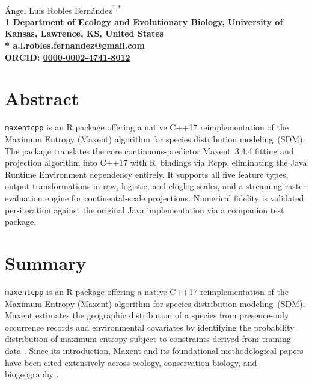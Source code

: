 \documentclass[10pt,letterpaper]{article}
\begin{document}
\vspace*{0.35in}

\begin{flushleft}
{\Large
\textbf{}
}
\newline
\\
\'Angel Luis Robles Fern\'andez\textsuperscript{1,*}
\\
\bigskip
\bf{1} Department of Ecology and Evolutionary Biology, University of Kansas, Lawrence, KS, United States
\\
\bigskip
* a.l.robles.fernandez@gmail.com
\\
ORCID: \href{https://orcid.org/0000-0002-4741-8012}{0000-0002-4741-8012}

\end{flushleft}

\section*{Abstract}

\texttt{maxentcpp} is an R package offering a native C++17
reimplementation of the Maximum Entropy (Maxent) algorithm for species
distribution modeling~(SDM). The package translates the core
continuous-predictor Maxent~3.4.4 fitting and projection algorithm into
C++17 with R~bindings via Rcpp, eliminating the Java Runtime Environment
dependency entirely. It supports all five feature types, output
transformations in raw, logistic, and cloglog scales, and a streaming
raster evaluation engine for continental-scale projections. Numerical
fidelity is validated per-iteration against the original Java
implementation via a companion test package.

\linenumbers

\section*{Summary}

\texttt{maxentcpp} is an R package offering a native C++17
reimplementation of the Maximum Entropy (Maxent) algorithm for species
distribution modeling~(SDM).
Maxent estimates the geographic distribution of a species from
presence-only occurrence records and environmental covariates by
identifying the probability distribution of maximum entropy subject to
constraints derived from training data
\cite{Phillips2006,Phillips2004}.
Since its introduction, Maxent and its foundational methodological papers
have been cited extensively across ecology, conservation biology, and
biogeography \cite{Elith2011}.
\end{document}
